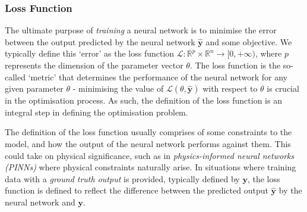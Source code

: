\documentclass[a4paper,11pt,titlepage]{article}
\theoremstyle{definition}
\theoremstyle{plain}
\theoremstyle{remark}
\begin{document}
\subsubsection{Loss Function}
\label{sec:loss}

The ultimate purpose of \textit{training} a neural network is to minimise the error between the output predicted by the neural network $\mathbf{\hat{y}}$ and some objective. We typically define this ‘error’ as the loss function $\mathcal{L}: \mathbb{R}^p \times \mathbb{R}^n \to [0, +\infty )$, where $p$ represents the dimension of the parameter vector $\theta$. The loss function is the so-called ‘metric’ that determines the performance of the neural network for any given parameter $\theta$ - minimising the value of $\mathcal{L}(\theta, \mathbf{\hat{y}})$ with respect to $\theta$ is crucial in the optimisation process. As such, the definition of the loss function is an integral step in defining the optimisation problem.

The definition of the loss function usually comprises of some constraints to the model, and how the output of the neural network performs against them. This could take on physical significance, such as in \textit{physics-informed neural networks (PINNs)} where physical constraints naturally arise. In situations where training data with a \textit{ground truth output} is provided, typically defined by $\mathbf{y}$, the loss function is defined to reflect the difference between the predicted output $\mathbf{\hat{y}}$ by the neural network and $\mathbf{y}$.
\end{document}
